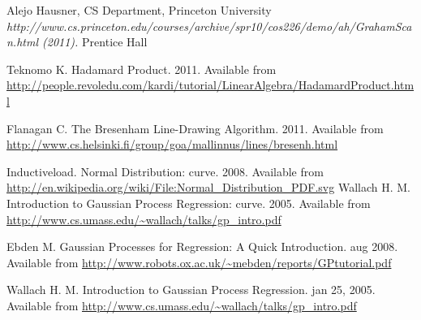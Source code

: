 
\begin{thebibliography}{4}
 Alejo Hausner, CS Department, Princeton University
 \emph{http://www.cs.princeton.edu/courses/archive/spr10/cos226/demo/ah/GrahamScan.html (2011).} Prentice Hall
 
 Teknomo K. Hadamard Product. 2011. Available from \url{http://people.revoledu.com/kardi/tutorial/LinearAlgebra/HadamardProduct.html} 

 Flanagan C. The Bresenham Line-Drawing Algorithm. 2011. Available from \url{http://www.cs.helsinki.fi/group/goa/mallinnus/lines/bresenh.html} 

 Inductiveload. Normal Distribution: curve. 2008. Available from \url{http://en.wikipedia.org/wiki/File:Normal_Distribution_PDF.svg} 
 Wallach H. M. Introduction to Gaussian Process Regression: curve. 2005. Available from \url{http://www.cs.umass.edu/~wallach/talks/gp_intro.pdf} 

 Ebden M. Gaussian Processes for Regression: A Quick Introduction. aug 2008. Available from \url{http://www.robots.ox.ac.uk/~mebden/reports/GPtutorial.pdf} 


 Wallach H. M. Introduction to Gaussian Process Regression. jan 25, 2005. Available from \url{http://www.cs.umass.edu/~wallach/talks/gp_intro.pdf} 




\end{thebibliography}
